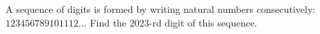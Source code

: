 A sequence of digits is formed by writing natural numbers consecutively: $123456789101112\ldots$ Find the $2023$-rd digit of this sequence.
